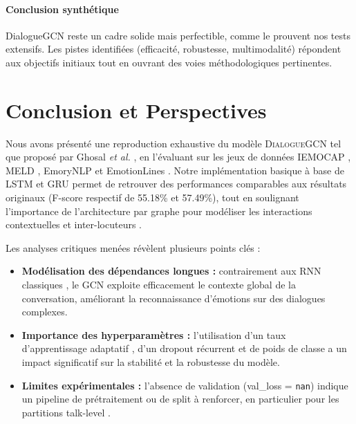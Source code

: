 \documentclass[a4paper,11pt]{article}
\begin{document}
\paragraph{Conclusion synthétique}
DialogueGCN reste un cadre solide mais perfectible, comme le prouvent nos tests extensifs. Les pistes identifiées (efficacité, robustesse, multimodalité) répondent aux objectifs initiaux tout en ouvrant des voies méthodologiques pertinentes.
\section{Conclusion et Perspectives}
\label{sec:conclusion}

Nous avons présenté une reproduction exhaustive du modèle \textsc{DialogueGCN} tel que proposé par Ghosal \emph{et al.} \cite{ghosal2019dialoguegcn}, en l'évaluant sur les jeux de données IEMOCAP \cite{Busso2008IEMOCAP}, MELD \cite{poria2019meld}, EmoryNLP \cite{poria2017context} et EmotionLines \cite{zahiri2018emotion}.  
Notre implémentation basique à base de LSTM et GRU permet de retrouver des performances comparables aux résultats originaux (F-score respectif de 55.18\% et 57.49\%), tout en soulignant l'importance de l'architecture par graphe pour modéliser les interactions contextuelles et inter-locuteurs \cite{kipf2016semi}.  

Les analyses critiques menées révèlent plusieurs points clés :
\begin{itemize}
  \item \textbf{Modélisation des dépendances longues :} contrairement aux RNN classiques \cite{majumder2019dialoguernn}, le GCN exploite efficacement le contexte global de la conversation, améliorant la reconnaissance d'émotions sur des dialogues complexes.  
  \item \textbf{Importance des hyperparamètres :} l'utilisation d'un taux d'apprentissage adaptatif \cite{chollet2015keras}, d'un dropout récurrent et de poids de classe a un impact significatif sur la stabilité et la robustesse du modèle.  
  \item \textbf{Limites expérimentales :} l'absence de validation (val\_loss = \texttt{nan}) indique un pipeline de prétraitement ou de split à renforcer, en particulier pour les partitions talk-level \cite{li2020graph}.  
\end{itemize}
\end{document}
